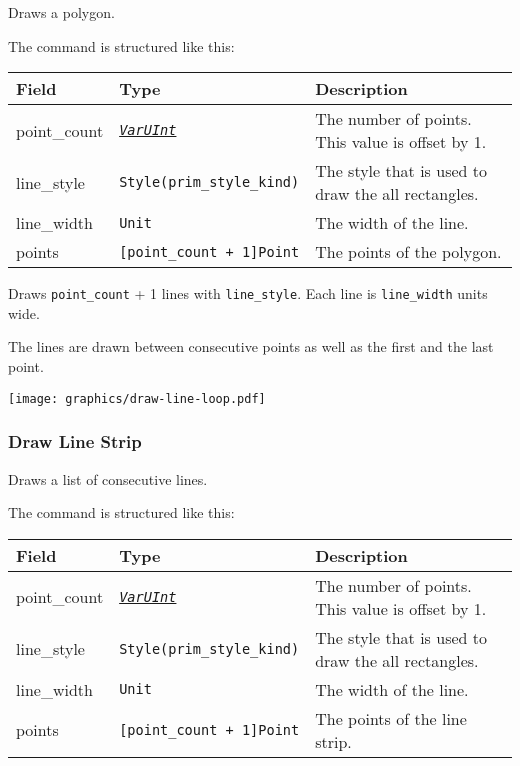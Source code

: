 \documentclass[]{article}
\newcommand{\link}[2]{\hyperlink{#1}{\emph{#2}}}
\begin{document}
Draws a polygon.

The command is structured like this:

\begin{longtable}[]{@{}p{1in}p{2in}p{3in}@{}}
\toprule
Field & Type & Description \\
\midrule
\endhead
point\_count & \link{varuint}{\texttt{VarUInt}}       & The number of points. This value is offset by 1. \\
line\_style  & \texttt{Style(prim\_style\_kind)}      & The style that is used to draw the all rectangles. \\
line\_width  & \texttt{Unit}                          & The width of the line. \\
points       & \texttt{{[}point\_count\ +\ 1{]}Point} & The points of the polygon. \\
\bottomrule
\end{longtable}

Draws \texttt{point\_count} + 1 lines with \texttt{line\_style}. Each
line is \texttt{line\_width} units wide.

The lines are drawn between consecutive points as well as the first and
the last point.

\begin{center}
\texttt{[image: graphics/draw-line-loop.pdf]}
\end{center}

\hypertarget{draw-line-strip}{\subsubsection{Draw Line Strip}\label{draw-line-strip}}

Draws a list of consecutive lines.

The command is structured like this:

\begin{longtable}[]{@{}p{1in}p{2in}p{3in}@{}}
\toprule
Field & Type & Description \\
\midrule
\endhead
point\_count & \link{varuint}{\texttt{VarUInt}}       & The number of points. This value is offset by 1. \\
line\_style  & \texttt{Style(prim\_style\_kind)}      & The style that is used to draw the all rectangles. \\
line\_width  & \texttt{Unit}                          & The width of the line. \\
points       & \texttt{{[}point\_count\ +\ 1{]}Point} & The points of the line strip. \\
\bottomrule
\end{longtable}
\end{document}
